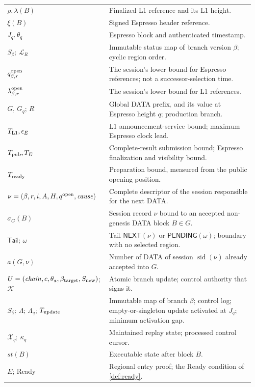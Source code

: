 \documentclass[11pt,a4paper]{article}
\newcommand{\tagg}[1]{\ensuremath{\mathsf{#1}}}
\begin{document}
\begin{table}[htbp]
\begin{tabularx}{\linewidth}{@{}p{.32\linewidth}Y@{}}
$\rho,\lambda(B)$ & Finalized L1 reference and its L1 height.\\
$\xi(B)$ & Signed Espresso header reference.\\
$J_q,\theta_q$ & Espresso block and authenticated timestamp.\\
$S_\beta$; $\mathcal L_R$ & Immutable status map of branch version $\beta$; cyclic region order.\\
$q_{\beta,r}^{\rm open}$ & The session's lower bound for Espresso references; not a successor-selection time.\\
$\lambda_{\beta,r}^{\rm open}$ & The session's lower bound for L1 references.\\
$G$, $G_q$; $R$ & Global DATA prefix, and its value at Espresso height $q$; production branch.\\
$T_{\rm L1},\epsilon_E$ & L1 announcement-service bound; maximum Espresso clock lead.\\
$T_{\rm pub},T_E$ & Complete-result submission bound; Espresso finalization and visibility bound.\\
$T_{\rm ready}$ & Preparation bound, measured from the public opening position.\\
$\nu=(\beta,r,i,A,H,q^{\rm open},\mathit{cause})$ & Complete descriptor of the session responsible for the next DATA.\\
$\sigma_G(B)$ & Session record $\nu$ bound to an accepted non-genesis DATA block $B\in G$.\\
$\mathsf{Tail}$; $\omega$ & Tail $\tagg{NEXT}(\nu)$ or $\tagg{PENDING}(\omega)$; boundary with no selected region.\\
$a(G,\nu)$ & Number of DATA of session $\operatorname{sid}(\nu)$ already accepted into $G$.\\
$U=(\mathit{chain},c,\theta_a,\beta_{\rm target},S_{\rm new})$; $\mathcal K$ & Atomic branch update; control authority that signs it.\\
$S_\beta$; $\Lambda$; $\Lambda_q$; $T_{\rm update}$ & Immutable map of branch $\beta$; control log; empty-or-singleton update activated at $J_q$; minimum activation gap.\\
$\mathcal X_q$; $\kappa_q$ & Maintained replay state; processed control cursor.\\
$\mathit{st}(B)$ & Executable state after block $B$.\\
$E$; Ready & Regional entry proof; the Ready condition of \cref{def:ready}.\\
\bottomrule\end{tabularx}
\end{table}
\end{document}
